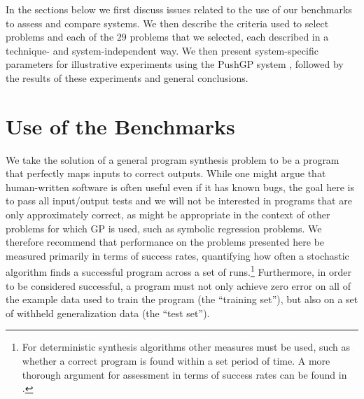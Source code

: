 \documentclass{sig-alternate}
\begin{document}
In the sections below we first discuss issues related to the use of our benchmarks to assess and compare systems. We then describe the criteria used to select problems and each of the $29$ problems that we selected, each described in a technique- and system-independent way. We then present system-specific parameters for illustrative experiments using the PushGP system \cite{spector:2002:GPEM, 1068292}, followed by the results of these experiments and general conclusions.

\section{Use of the Benchmarks}

We take the solution of a general program synthesis problem to be a program that perfectly maps inputs to correct outputs. While one might argue that human-written software is often useful even if it has known bugs, the goal here is to pass all input/output tests and we will  not be interested in  programs that are only approximately correct, as might be appropriate in the context of other problems for which GP is used, such as symbolic regression problems. We therefore recommend that performance on the problems presented here be measured primarily in terms of success rates, quantifying how often a stochastic algorithm finds a successful program across a set of runs.\footnote{For deterministic synthesis algorithms other measures must be used, such as whether a correct program is found within a set period of time. A more thorough argument for assessment in terms of success rates can be found in \cite{Helmuth:2014:GECCO}.}
Furthermore, in order to be considered successful, a program must not only achieve zero error on all of the example data used to train the program (the ``training set''), but also on a set of withheld generalization data (the ``test set''). 




\end{document}
